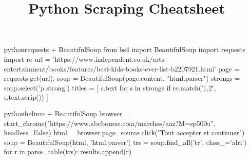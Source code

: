 \documentclass[10pt,a4paper]{article}
\title{\color{w3schools}Python Scraping Cheatsheet
}
\begin{document}
\maketitle
\small
\begin{multicols}{3}

\thispagestyle{empty}
\scriptsize

% 




\begin{codebox}{python}{requests + BeautifulSoup}
from bs4 import BeautifulSoup
import requests
import re
url = 'https://www.independent.co.uk/arts-entertainment/books/features/best-kids-books-ever-list-b2207921.html'
page = requests.get(url);
soup = BeautifulSoup(page.content, "html.parser")
strongs = soup.select('p strong')
titles = [ s.text for s in strongs if re.match('\d{1,2}\.', s.text.strip()) ]

\end{codebox}

\begin{codebox}{python}{helium + BeautifulSoup}
browser = start_chrome("https://www.abcbourse.com/marches/aaz?M=sp500u", headless=False)
html = browser.page_source
click("Tout accepter et continuer")
soup = BeautifulSoup(html, 'html.parser')
trs = soup.find_all('tr', class_='alri')
for r in parse_table(trs):
   results.append(r)

\end{codebox}


\AtNextBibliography{\footnotesize}
\printbibliography  
\end{multicols}
\end{document}
